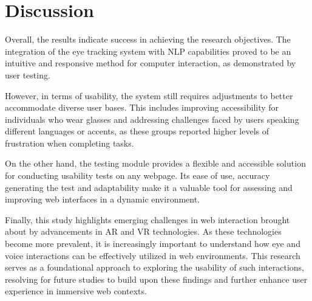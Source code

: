 \section{Discussion}

Overall, the results indicate success in achieving the research objectives. The integration of the eye tracking system with NLP capabilities proved to be an intuitive and responsive method for computer interaction, as demonstrated by user testing. 

However, in terms of usability, the system still requires adjustments to better accommodate diverse user bases. This includes improving accessibility for individuals who wear glasses and addressing challenges faced by users speaking different languages or accents, as these groups reported higher levels of frustration when completing tasks.

On the other hand, the testing module provides a flexible and accessible solution for conducting usability tests on any webpage. Its ease of use, accuracy generating the test and adaptability make it a valuable tool for assessing and improving web interfaces in a dynamic environment.

Finally, this study highlights emerging challenges in web interaction brought about by advancements in AR and VR technologies. As these technologies become more prevalent, it is increasingly important to understand how eye and voice interactions can be effectively utilized in web environments. This research serves as a foundational approach to exploring the usability of such interactions, resolving for future studies to build upon these findings and further enhance user experience in immersive web contexts.
